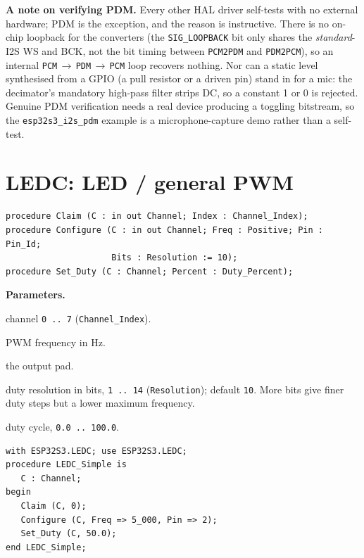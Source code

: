 \textbf{A note on verifying PDM.} Every other HAL driver self-tests with no
external hardware; PDM is the exception, and the reason is instructive. There is
no on-chip loopback for the converters (the \texttt{SIG\_LOOPBACK} bit only
shares the \emph{standard}-I2S WS and BCK, not the bit timing between
\texttt{PCM2PDM} and \texttt{PDM2PCM}), so an internal
\texttt{PCM}\,$\rightarrow$\,\texttt{PDM}\,$\rightarrow$\,\texttt{PCM} loop
recovers nothing. Nor can a static level
synthesised from a GPIO (a pull resistor or a driven pin) stand in for a mic: the
decimator's mandatory high-pass filter strips DC, so a constant 1 or 0 is rejected.
Genuine PDM verification needs a real device producing a toggling bitstream, so
the \texttt{esp32s3\_i2s\_pdm} example is a microphone-capture demo rather than a
self-test.

\section{LEDC: LED / general PWM}

\begin{lstlisting}
procedure Claim (C : in out Channel; Index : Channel_Index);
procedure Configure (C : in out Channel; Freq : Positive; Pin : Pin_Id;
                     Bits : Resolution := 10);
procedure Set_Duty (C : Channel; Percent : Duty_Percent);
\end{lstlisting}

\textbf{Parameters.}
\begin{description}[style=nextline]
\item[\texttt{Index}] channel \texttt{0\,..\,7} (\texttt{Channel\_Index}).
\item[\texttt{Freq}] PWM frequency in Hz.
\item[\texttt{Pin}] the output pad.
\item[\texttt{Bits}] duty resolution in bits, \texttt{1\,..\,14}
  (\texttt{Resolution}); default \texttt{10}. More bits give finer duty steps but a
  lower maximum frequency.
\item[\texttt{Percent}] duty cycle, \texttt{0.0\,..\,100.0}.
\end{description}

\begin{lstlisting}
with ESP32S3.LEDC; use ESP32S3.LEDC;
procedure LEDC_Simple is
   C : Channel;
begin
   Claim (C, 0);
   Configure (C, Freq => 5_000, Pin => 2);
   Set_Duty (C, 50.0);
end LEDC_Simple;
\end{lstlisting}

